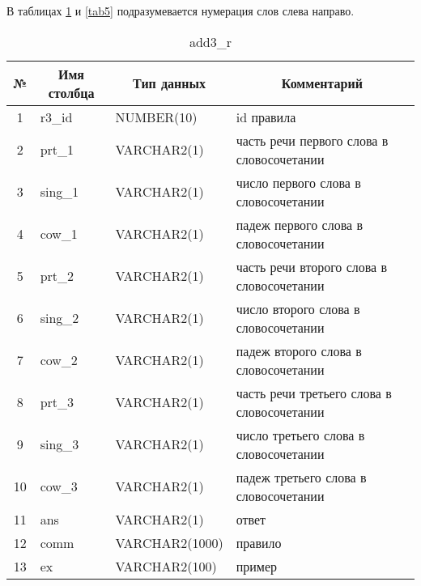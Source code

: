 \documentclass[main]{subfiles}
\begin{document}
В таблицах \ref{tab4} и \ref{tab5} подразумевается нумерация слов слева направо.
\begin{table}[!h]
	\begin{center}
		\captionsetup{format=hang,labelsep = endash, singlelinecheck=false}
		\caption{add3\_r}\label{tab4}
		\begin{tabular}{|c|l|l|l|}
			\hline
			\textbf{№} & \multicolumn{1}{c|}{\textbf{Имя столбца}} & \multicolumn{1}{c|}{\textbf{Тип данных}} & \multicolumn{1}{c|}{\textbf{Комментарий}} \\ \hline
			1&r3\_id &NUMBER(10) &id правила\\ \hline
			2& prt\_1 &VARCHAR2(1) & часть речи первого слова в словосочетании \\ \hline
			3& sing\_1 &VARCHAR2(1) & число первого слова в словосочетании \\ \hline
			4& cow\_1 &VARCHAR2(1) & падеж первого слова в словосочетании \\ \hline
			5& prt\_2 & VARCHAR2(1)& часть речи второго слова в словосочетании \\ \hline
			6& sing\_2 &VARCHAR2(1) & число второго слова в словосочетании \\ \hline
			7& cow\_2 &VARCHAR2(1) & падеж второго слова в словосочетании \\ \hline
			8& prt\_3 & VARCHAR2(1)& часть речи третьего слова в словосочетании \\ \hline
			9& sing\_3 &VARCHAR2(1) & число третьего слова в словосочетании \\ \hline
			10& cow\_3 &VARCHAR2(1) & падеж третьего слова в словосочетании \\ \hline
			11&ans&VARCHAR2(1)& ответ\\ \hline
			12&comm &VARCHAR2(1000)& правило\\ \hline
			13 &ex &VARCHAR2(100)&пример  \\ \hline
		\end{tabular}
	\end{center}
\end{table}
\end{document}
